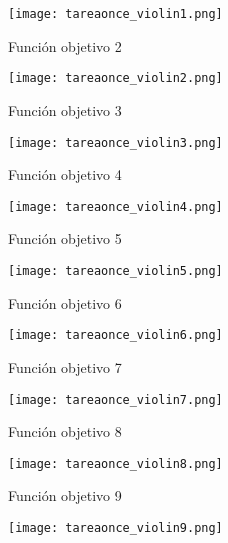 \documentclass{article}
\begin{document}
\begin{figure}[H]
       \centering
       \begin{subfigure}[b]{0.30\linewidth}
           \texttt{[image: tareaonce\_violin1.png]}
           \caption{Funci\'on objetivo 2}
           \label{fig:westminster_lateral}
        \end{subfigure}
        \begin{subfigure}[b]{0.30\linewidth}
           \texttt{[image: tareaonce\_violin2.png]}
           \caption{Funci\'on objetivo 3}
           \label{fig:westminster_lateral}
        \end{subfigure}
        \begin{subfigure}[b]{0.30\linewidth}
           \texttt{[image: tareaonce\_violin3.png]}
           \caption{Funci\'on objetivo 4}
           \label{fig:westminster_lateral}
        \end{subfigure}
        \begin{subfigure}[b]{0.30\linewidth}
           \texttt{[image: tareaonce\_violin4.png]}
           \caption{Funci\'on objetivo 5}
           \label{fig:westminster_lateral}
        \end{subfigure}
         \begin{subfigure}[b]{0.30\linewidth}
           \texttt{[image: tareaonce\_violin5.png]}
           \caption{Funci\'on objetivo 6}
           \label{fig:westminster_lateral}
        \end{subfigure}  
        \begin{subfigure}[b]{0.30\linewidth}
           \texttt{[image: tareaonce\_violin6.png]}
           \caption{Funci\'on objetivo 7}
           \label{fig:westminster_lateral}
        \end{subfigure}
        \begin{subfigure}[b]{0.30\linewidth}
           \texttt{[image: tareaonce\_violin7.png]}
           \caption{Funci\'on objetivo 8}
           \label{fig:westminster_lateral}
        \end{subfigure}
        \begin{subfigure}[b]{0.30\linewidth}
           \texttt{[image: tareaonce\_violin8.png]}
           \caption{Funci\'on objetivo 9}
           \label{fig:westminster_lateral}
        \end{subfigure}
        \begin{subfigure}[b]{0.30\linewidth}
           \texttt{[image: tareaonce\_violin9.png]}

\end{subfigure}
\end{figure}
\end{document}
